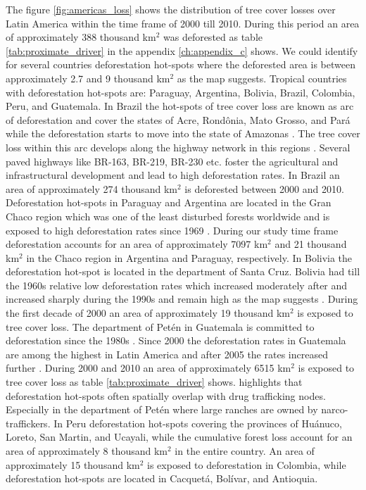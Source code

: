 			The figure \ref{fig:americas_loss} shows the distribution of tree cover losses over Latin America within the time frame of 2000 till 2010. During this period an area of approximately 388 thousand km$^2$ was deforested as table \ref{tab:proximate_driver} in the appendix \ref{ch:appendix_c} shows. We could identify for several countries deforestation hot-spots where the deforested area is between approximately 2.7 and 9 thousand km$^2$ as the map suggests. Tropical countries with deforestation hot-spots are: Paraguay, Argentina, Bolivia, Brazil, Colombia, Peru, and Guatemala. In Brazil the hot-spots of tree cover loss are known as arc of deforestation and cover the states of Acre, Rond\^{o}nia, Mato Grosso, and Pará while the deforestation starts to move into the state of Amazonas \citep{Wood2002}. The tree cover loss within this arc develops along the highway network in this regions \citep{Alves2002,Mueller2016}. Several paved highways like BR-163, BR-219, BR-230 etc. foster the agricultural and infrastructural development and lead to high deforestation rates. In Brazil an area of approximately 274 thousand km$^2$ is deforested between 2000 and 2010. Deforestation hot-spots in Paraguay and Argentina are located in the Gran Chaco region which was one of the least disturbed forests worldwide and is exposed to high deforestation rates since 1969 \citep{Caldas2013,Zak2004}. During our study time frame deforestation accounts for an area of approximately 7097 km$^2$ and 21 thousand km$^2$ in the Chaco region in Argentina and Paraguay, respectively. In Bolivia the deforestation hot-spot is located in the department of Santa Cruz. Bolivia had till the 1960s relative low deforestation rates which increased moderately after and increased sharply during the 1990s and remain high as the map suggests \citep{Pacheco2002,DavidKaimowitz2002}. During the first decade of 2000 an area of approximately 19 thousand km$^2$ is exposed to tree cover loss. The department of Petén in Guatemala is committed to deforestation since the 1980s \citep{Beach1998}. Since 2000 the deforestation rates in Guatemala are among the highest in Latin America and after 2005 the rates increased further \citep{McSweeney2014}. During 2000 and 2010 an area of approximately 6515 km$^2$ is exposed to tree cover loss as table \ref{tab:proximate_driver} shows. \citeauthor{McSweeney2014} highlights that deforestation hot-spots often spatially overlap with drug trafficking nodes. Especially in the department of Petén where large ranches are owned by narco-traffickers. In Peru deforestation hot-spots covering the provinces of Huánuco, Loreto, San Martin, and Ucayali, while the cumulative forest loss account for an area of approximately 8 thousand km$^2$ in the entire country. An area of approximately 15 thousand km$^2$ is exposed to deforestation in Colombia, while deforestation hot-spots are located in Cacquetá, Bolívar, and Antioquia.
